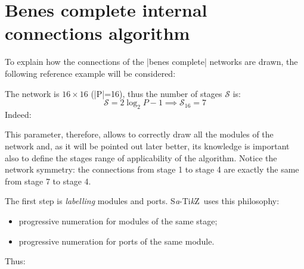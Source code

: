 \documentclass{ltxdoc}
\newcommand\Tikz{Ti\textit kZ}
\newcommand{\saTikZ}{S\textit{a}-\Tikz}
\begin{document}
\clearpage
\appendix

\section{Benes complete internal connections algorithm}
\label{sec:benesconnalg}
To explain how the connections of the |benes complete| networks are drawn, the following reference example will be considered:
\begin{center}
\scalebox{0.75}{
	\begin{tikzpicture}[module size=0.75cm, module ysep=1, module xsep=2.5]
		\node[P=16, benes complete]{};
	\end{tikzpicture}
}
\end{center}
The network is $16\times 16$ (|P|=16), thus the number of stages $\mathcal{S}$ is:
\[\mathcal{S}=2\log_2{P}-1 \implies \mathcal{S}_{16}=7\]
Indeed:
\begin{center}
\end{center}
This parameter, therefore, allows to correctly draw all the modules of the network and, as it will be pointed out later better, its knowledge is important also to define the stages range of applicability of the algorithm. Notice the network symmetry: the connections from stage 1 to stage 4 are exactly the same from stage 7 to stage 4.  
\pagebreak

The first step is \emph{labelling} modules and ports. \saTikZ\ uses this philosophy:
\begin{itemize}
\item progressive numeration for modules of the same stage;
\item progressive numeration for ports of the same module.
\end{itemize}

Thus:
\begin{center}
\end{center}
\end{document}
